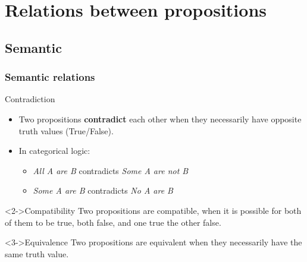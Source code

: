 \documentclass[10pt,letterpaper,xcolor=dvipsnames,handout]{beamer}
\begin{document}
\section{Relations between propositions}
\subsection{Semantic}

\begin{frame}
  \frametitle{Semantic relations}
  
  \begin{block}{Contradiction}
    \begin{itemize}
      \item Two propositions \textbf{contradict} each other when they necessarily have opposite truth values (True/False).
      \item In categorical logic:
        \begin{itemize}
          \item \textit{All A are B} contradicts \textit{Some A are not B}
          \item \textit{Some A are B} contradicts \textit{No A are B}
        \end{itemize}
    \end{itemize}
  \end{block}
  
  \begin{block}<2->{Compatibility}
    Two propositions are compatible, when it is possible for both of them to be true, both false, and one true the other false.
  \end{block}
  
  \begin{block}<3->{Equivalence}
    Two propositions are equivalent when they necessarily have the same truth value.
  \end{block}
  
\end{frame}
\end{document}
